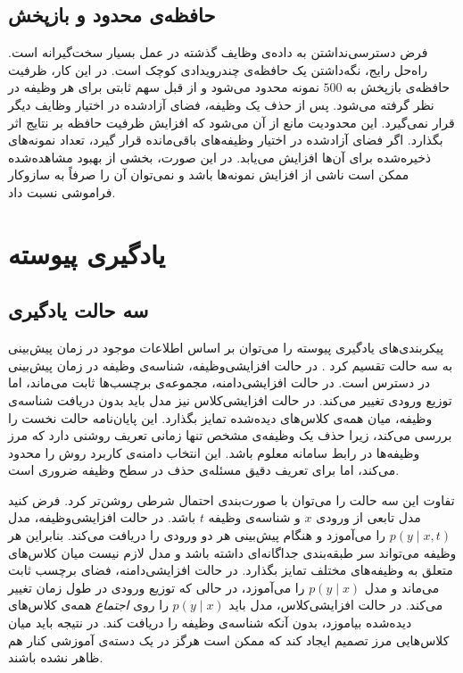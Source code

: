 \subsection{حافظه‌ی محدود و بازپخش}
\label{subsec:lit-memory}

فرض دسترسی‌نداشتن به داده‌ی وظایف گذشته در عمل بسیار سخت‌گیرانه است. راه‌حل رایج، نگه‌داشتن یک {حافظه‌ی چندرویدادی} کوچک است. در این کار، ظرفیت حافظه‌ی بازپخش به $500$ نمونه محدود می‌شود و از قبل سهم ثابتی برای هر وظیفه در نظر گرفته می‌شود. پس از حذف یک وظیفه، فضای آزادشده در اختیار وظایف دیگر قرار نمی‌گیرد. این محدودیت مانع از آن می‌شود که افزایش ظرفیت حافظه بر نتایج اثر بگذارد. اگر فضای آزادشده در اختیار وظیفه‌های باقی‌مانده قرار گیرد، تعداد نمونه‌های ذخیره‌شده برای آن‌ها افزایش می‌یابد. در این صورت، بخشی از بهبود مشاهده‌شده ممکن است ناشی از افزایش نمونه‌ها باشد و نمی‌توان آن را صرفاً به سازوکار فراموشی نسبت داد.

\section{یادگیری پیوسته}
\label{sec:lit-cl}

\subsection{سه حالت یادگیری}
\label{subsec:lit-scenarios}

پیکربندی‌های یادگیری پیوسته را می‌توان بر اساس اطلاعات موجود در زمان پیش‌بینی به سه حالت تقسیم کرد \cite{vandeven2022three}. در حالت {افزایشی‌وظیفه}، شناسه‌ی وظیفه در زمان پیش‌بینی در دسترس است. در حالت {افزایشی‌دامنه}، مجموعه‌ی برچسب‌ها ثابت می‌ماند، اما توزیع ورودی تغییر می‌کند. در حالت {افزایشی‌کلاس} نیز مدل باید بدون دریافت شناسه‌ی وظیفه، میان همه‌ی کلاس‌های دیده‌شده تمایز بگذارد. این پایان‌نامه حالت نخست را بررسی می‌کند، زیرا حذف یک وظیفه‌ی مشخص تنها زمانی تعریف روشنی دارد که مرز وظیفه‌ها در رابط سامانه معلوم باشد. این انتخاب دامنه‌ی کاربرد روش را محدود می‌کند، اما برای تعریف دقیق مسئله‌ی حذف در سطح وظیفه ضروری است.

تفاوت این سه حالت را می‌توان با صورت‌بندی احتمال شرطی روشن‌تر کرد. فرض کنید مدل تابعی از ورودی $x$ و شناسه‌ی وظیفه $t$ باشد. در حالت افزایشی‌وظیفه، مدل $p(y \mid x,t)$ را می‌آموزد و هنگام پیش‌بینی هر دو ورودی را دریافت می‌کند. بنابراین هر وظیفه می‌تواند {سر طبقه‌بندی} جداگانه‌ای داشته باشد و مدل لازم نیست میان کلاس‌های متعلق به وظیفه‌های مختلف تمایز بگذارد. در حالت افزایشی‌دامنه، فضای برچسب ثابت می‌ماند و مدل $p(y \mid x)$ را می‌آموزد، در حالی که توزیع ورودی در طول زمان تغییر می‌کند. در حالت افزایشی‌کلاس، مدل باید $p(y \mid x)$ را روی \emph{اجتماع} همه‌ی کلاس‌های دیده‌شده بیاموزد، بدون آنکه شناسه‌ی وظیفه را دریافت کند. در نتیجه باید میان کلاس‌هایی مرز تصمیم ایجاد کند که ممکن است هرگز در یک دسته‌ی آموزشی کنار هم ظاهر نشده باشند.

